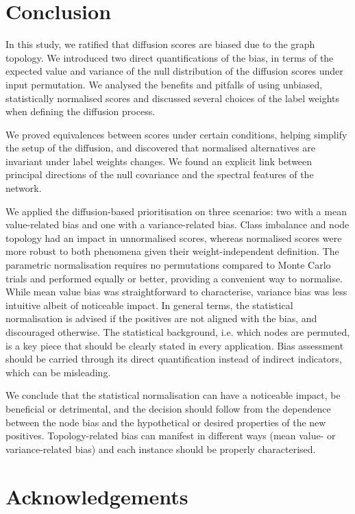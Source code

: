 \documentclass[final]{bioinfo}
\begin{document}
\section*{Conclusion}

In this study, we ratified that diffusion scores are biased due to the graph topology. 
We introduced two direct quantifications of the bias, in terms of the expected value and variance of the null distribution of the diffusion scores under input permutation.
We analysed the benefits and pitfalls of using unbiased, statistically normalised scores and discussed several choices of the label weights when defining the diffusion process. 

We proved equivalences between scores under certain conditions, helping simplify the setup of the diffusion, and discovered that normalised alternatives are invariant under label weights changes. 
We found an explicit link between principal directions of the null covariance and the spectral features of the network.

We applied the diffusion-based prioritisation on three scenarios: two with a mean value-related bias and one with a variance-related bias. 
Class imbalance and node topology had an impact in unnormalised scores, whereas
normalised scores were more robust to both phenomena given their weight-independent definition. 
The parametric normalisation requires no permutations compared to Monte Carlo trials and performed equally or better, providing a convenient way to normalise.
While mean value bias was straightforward to characterise, variance bias was less intuitive albeit of noticeable impact. 
In general terms, the statistical normalisation is advised if the positives are not aligned with the bias, and discouraged otherwise. 
The statistical background, i.e. which nodes are permuted, is a key piece that should be clearly stated in every application.
Bias assessment should be carried through its direct quantification instead of indirect indicators, which can be misleading.
 
We conclude that the statistical normalisation can have a noticeable impact, be beneficial or detrimental, and the decision should follow from the dependence between the node bias and the hypothetical or desired properties of the new positives. 
Topology-related bias can manifest in different ways (mean value- or variance-related bias) and each instance should be properly characterised.


\section*{Acknowledgements}
\end{document}
